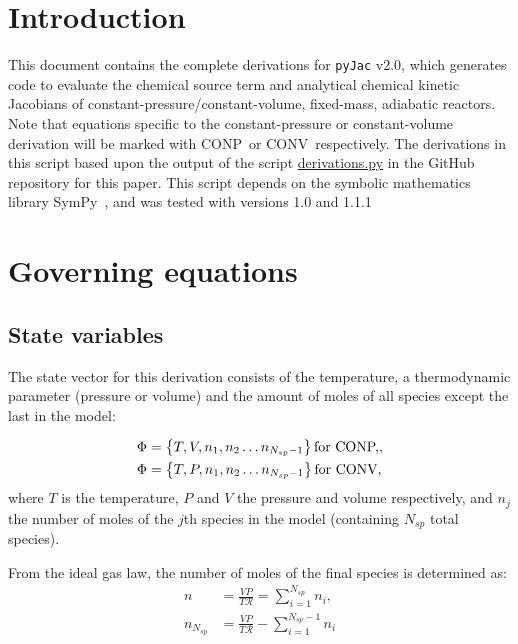 \documentclass[12pt]{article}
\newcommand{\ns}{N_{sp}}
\newcommand{\conp}{CONP}
\newcommand{\conv}{CONV}
\newcommand{\dconp}{\ifmmode\text{for \conp,}\else for \conp,\fi}
\newcommand{\dconv}{\ifmmode\text{for \conv,}\else for \conv,\fi}
\newcommand{\Ru}{\mathcal{R}}
\begin{document}
\section{Introduction}
This document contains the complete derivations for \texttt{pyJac} v2.0, which generates code to evaluate the chemical source term and analytical chemical kinetic Jacobians of constant-pressure\slash constant-volume, fixed-mass, adiabatic reactors.
Note that equations specific to the constant-pressure or constant-volume derivation will be marked with \conp~or \conv~respectively.
The derivations in this script based upon the output of the script \href{https://github.com/arghdos/SPyJac-paper/blob/master/derivations/scripts/derivations.py}{derivations.py} in the GitHub repository for this paper.
This script depends on the symbolic mathematics library SymPy~\cite{sympy}, and was tested with versions 1.0 and 1.1.1

\section{Governing equations}
\subsection{State variables}
The state vector for this derivation consists of the temperature, a thermodynamic parameter (pressure or volume) and the amount of moles of all species except the last in the model:

\begin{subequations}
\begin{align}
\Phi &= \left\{T, V, n_1, n_2 \ldots n_{\ns - 1}\right\}\dconp, \\
\Phi &= \left\{T, P, n_1, n_2 \ldots n_{\ns - 1}\right\}\dconv
\end{align}
\end{subequations}
where $T$ is the temperature, $P$ and $V$ the pressure and volume respectively, and $n_j$ the number of moles of the $j$th species in the model (containing $\ns$ total species).

From the ideal gas law, the number of moles of the final species is determined as:
\begin{align}
n &= \frac{V P}{T \Ru} = \sum_{i=1}^{\ns}{n_i}, \label{e:source_moles}\\
n_{\ns} &= \frac{V P}{T \Ru} - \sum_{i=1}^{\ns - 1}{n_i}
\end{align}
\end{document}
